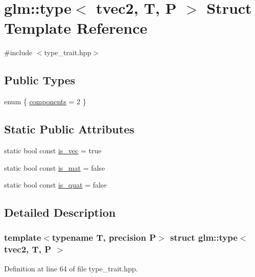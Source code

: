 \hypertarget{structglm_1_1type_3_01tvec2_00_01_t_00_01_p_01_4}{}\section{glm\+::type$<$ tvec2, T, P $>$ Struct Template Reference}
\label{structglm_1_1type_3_01tvec2_00_01_t_00_01_p_01_4}


{\ttfamily \#include $<$type\+\_\+trait.\+hpp$>$}

\subsection*{Public Types}
\begin{DoxyCompactItemize}
\item 
enum \{ \mbox{\hyperlink{structglm_1_1type_3_01tvec2_00_01_t_00_01_p_01_4_a2c93c2759a954a2de21fe375f1558f34a71937c03f8888388dd6872cbdaa79196}{components}} = 2
 \}
\end{DoxyCompactItemize}
\subsection*{Static Public Attributes}
\begin{DoxyCompactItemize}
\item 
static bool const \mbox{\hyperlink{structglm_1_1type_3_01tvec2_00_01_t_00_01_p_01_4_aed111ecdb903d7e207978088eeeec8de}{is\+\_\+vec}} = true
\item 
static bool const \mbox{\hyperlink{structglm_1_1type_3_01tvec2_00_01_t_00_01_p_01_4_ae7f076df719e4dc42c5ca75b0255859d}{is\+\_\+mat}} = false
\item 
static bool const \mbox{\hyperlink{structglm_1_1type_3_01tvec2_00_01_t_00_01_p_01_4_afd8565961dba49d7045fd9c53a7b71d1}{is\+\_\+quat}} = false
\end{DoxyCompactItemize}


\subsection{Detailed Description}
\subsubsection*{template$<$typename T, precision P$>$\newline
struct glm\+::type$<$ tvec2, T, P $>$}



Definition at line 64 of file type\+\_\+trait.\+hpp.



